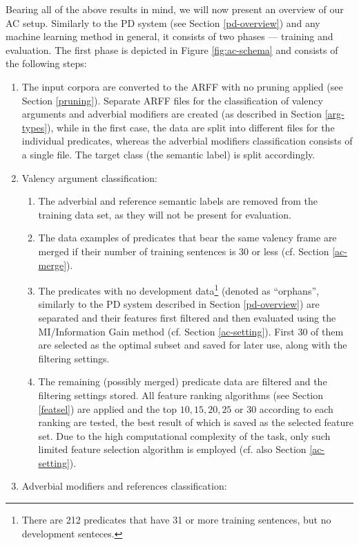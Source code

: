\documentclass[12pt,notitlepage]{report}
\begin{document}
Bearing all of the above results in mind, we will now present an overview of our AC setup. Similarly to the PD system (see Section \ref{pd-overview}) and any machine learning method in general, it consists of two phases --- training and evaluation. The first phase is depicted in Figure \ref{fig:ac-schema} and consists of the following steps:
\begin{enumerate}
    \item The input corpora are converted to the ARFF with no pruning applied (see Section \ref{pruning}). Separate ARFF files for the classification of valency arguments and adverbial modifiers are created (as described in Section \ref{arg-types}), while in the first case, the data are split into different files for the individual predicates, whereas the adverbial modifiers classification consists of a single file. The target class (the semantic label) is split accordingly.
    \item Valency argument classification:
    \begin{enumerate}
        \item The adverbial and reference semantic labels are removed from the training data set, as they will not be present for evaluation.
        \item The data examples of predicates that bear the same valency frame are merged if their number of training sentences is 30 or less (cf. Section \ref{ac-merge}).
        \item The predicates with no development data\footnote{There are 212 predicates that have 31 or more training sentences, but no development senteces.} (denoted as ``orphans'', similarly to the PD system described in Section \ref{pd-overview}) are separated and their features first filtered and then evaluated using the MI/Information Gain method (cf. Section \ref{ac-setting}). First 30 of them are selected as the optimal subset and saved for later use, along with the filtering settings.
        \item The remaining (possibly merged) predicate data are filtered and the filtering settings stored. All feature ranking algorithms (see Section \ref{featsel}) are applied and the top $10,15,20,25$ or $30$ according to each ranking are tested, the best result of which is saved as the selected feature set. Due to the high computational complexity of the task, only such limited feature selection algorithm is employed (cf. also Section \ref{ac-setting}).
    \end{enumerate}
    \item Adverbial modifiers and references classification:

\end{enumerate}
\end{document}
